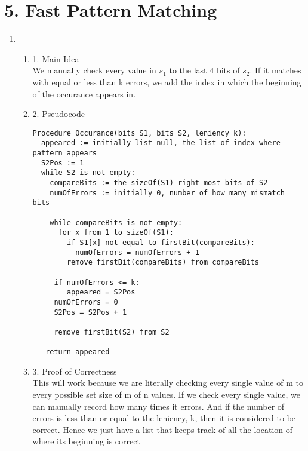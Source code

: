 \documentclass[11pt]{article}
\newenvironment{qparts}{\begin{enumerate}[{(}a{)}]}{\end{enumerate}}
\begin{document}
\newpage
\section*{5. Fast Pattern Matching}

\begin{qparts}
\item 
\begin{qparts}
\item[1.] Main Idea \\
We manually check every value in $s_1$ to the last 4 bits of $s_2$. If it matches with equal or less than k errors, we add the index in which the beginning of the occurance appears in. 
\item[2.] Pseudocode
\begin{verbatim}
Procedure Occurance(bits S1, bits S2, leniency k): 
  appeared := initially list null, the list of index where pattern appears
  S2Pos := 1
  while S2 is not empty: 
    compareBits := the sizeOf(S1) right most bits of S2
    numOfErrors := initially 0, number of how many mismatch bits
    
    while compareBits is not empty:
      for x from 1 to sizeOf(S1):
        if S1[x] not equal to firstBit(compareBits):
          numOfErrors = numOfErrors + 1
        remove firstBit(compareBits) from compareBits
        
     if numOfErrors <= k:
        appeared = S2Pos
     numOfErrors = 0
     S2Pos = S2Pos + 1
     
     remove firstBit(S2) from S2
     
   return appeared
\end{verbatim}

\item[3.] Proof of Correctness \\
This will work because we are literally checking every single value of m to every possible set size of m of n values. If we check every single value, we can manually record how many times it errors. And if the number of errors is less than or equal to the leniency, k, then it is considered to be correct. Hence we just have a list that keeps track of all the location of where its beginning is correct


\end{qparts}
\end{qparts}
\end{document}
